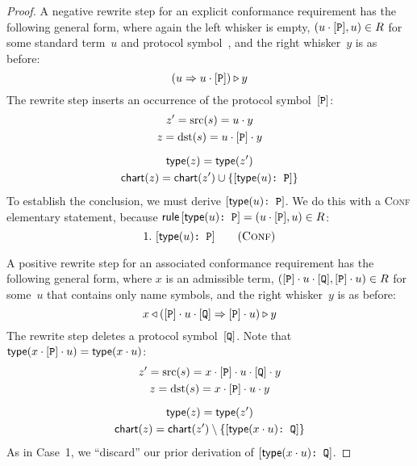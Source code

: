 \documentclass[../generics]{subfiles}
\begin{document}
\begin{proof}
 A negative rewrite step for an explicit conformance requirement has the following general form, where again the left whisker is empty, $(u\cdot[\texttt{P}],u)\in R$ for some standard term~$u$ and protocol symbol~\pP, and the right whisker~$y$ is as before:
\[(u\Rightarrow u\cdot[\texttt{P}])\triangleright y\]
The rewrite step inserts an occurrence of the protocol symbol~$[\texttt{P}]$:
\begin{gather*}
z^\prime=\operatorname{src}(s)=u\cdot y\\
z=\operatorname{dst}(s)=u\cdot[\texttt{P}]\cdot y\\[\medskipamount]
\mathsf{type}(z)=\mathsf{type}(z^\prime)\\
\mathsf{chart}(z)=\mathsf{chart}(z^\prime) \cup \{[\texttt{$\mathsf{type}(u)$:~P}]\}
\end{gather*}
To establish the conclusion, we must derive $[\texttt{$\mathsf{type}(u)$:~P}]$. We do this with a \textsc{Conf} elementary statement, because $\mathsf{rule}\,[\texttt{$\mathsf{type}(u)$:~P}]=(u\cdot[\texttt{P}],u)\in R$:
\[
\ConfStep{$\Type(u)$}{P}{1}
\]

 A positive rewrite step for an associated conformance requirement has the following general form, where $x$ is an admissible term, $([\texttt{P}]\cdot u\cdot[\texttt{Q}],[\texttt{P}]\cdot u)\in R$ for some~$u$ that contains only name symbols, and the right whisker~$y$ is as before:
\[x\triangleleft([\texttt{P}]\cdot u\cdot[\texttt{Q}]\Rightarrow[\texttt{P}]\cdot u)\triangleright y\]
The rewrite step deletes a protocol symbol~$[\texttt{Q}]$. Note that $\mathsf{type}(x\cdot [\texttt{P}] \cdot u)=\mathsf{type}(x\cdot u)$:
\begin{gather*}
z^\prime=\operatorname{src}(s)=x\cdot[\texttt{P}]\cdot u\cdot[\texttt{Q}]\cdot y\\
z=\operatorname{dst}(s)=x\cdot[\texttt{P}]\cdot u\cdot y\\[\medskipamount]
\mathsf{type}(z)=\mathsf{type}(z^\prime)\\
\mathsf{chart}(z)=\mathsf{chart}(z^\prime) \setminus \{[\texttt{$\mathsf{type}(x\cdot u)$:~Q}]\}
\end{gather*}
As in Case~1, we ``discard'' our prior derivation of $[\texttt{$\mathsf{type}(x\cdot u)$:~Q}]$.


\end{proof}
\end{document}
